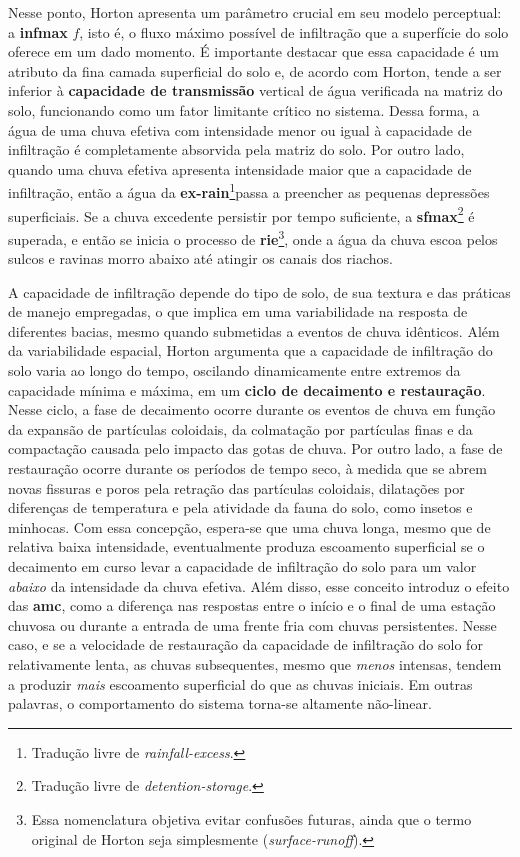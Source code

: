\documentclass[./main.tex]{subfiles}
\begin{document}
\par Nesse ponto, Horton apresenta um parâmetro crucial em seu modelo perceptual: a \textbf{\gls{infmax}} $f$, isto é, o fluxo máximo possível de infiltração que a superfície do solo oferece em um dado momento. É importante destacar que essa capacidade é um atributo da fina camada superficial do solo e, de acordo com Horton, tende a ser inferior à \textbf{capacidade de transmissão} vertical de água verificada na matriz do solo, funcionando como um fator limitante crítico no sistema. Dessa forma, a água de uma chuva efetiva com intensidade menor ou igual à capacidade de infiltração é completamente absorvida pela matriz do solo. Por outro lado, quando uma chuva efetiva apresenta intensidade maior que a capacidade de infiltração, então a água da \textbf{\gls{ex-rain}}\footnote{Tradução livre de \textit{rainfall-excess}.}passa a preencher as pequenas depressões superficiais. Se a chuva excedente persistir por tempo suficiente, a \textbf{\gls{sfmax}}\footnote{Tradução livre de \textit{detention-storage}.} é superada, e então se inicia o processo de \textbf{\gls{rie}}\footnote{Essa nomenclatura objetiva evitar confusões futuras, ainda que o termo original de Horton seja simplesmente  (\textit{surface-runoff}).}, onde a água da chuva escoa pelos sulcos e ravinas morro abaixo até atingir os canais dos riachos. 

\par A capacidade de infiltração depende do tipo de solo, de sua textura e das práticas de manejo empregadas, o que implica em uma variabilidade na resposta de diferentes bacias, mesmo quando submetidas a eventos de chuva idênticos. Além da variabilidade espacial, Horton argumenta que a capacidade de infiltração do solo varia ao longo do tempo, oscilando dinamicamente entre extremos da capacidade mínima e máxima, em um \textbf{ciclo de decaimento e restauração}. Nesse ciclo, a fase de decaimento ocorre durante os eventos de chuva em função da expansão de partículas coloidais, da colmatação por partículas finas e da compactação causada pelo impacto das gotas de chuva. Por outro lado, a fase de restauração ocorre durante os períodos de tempo seco, à medida que se abrem novas fissuras e poros pela retração das partículas coloidais, dilatações por diferenças de temperatura e pela atividade da fauna do solo, como insetos e minhocas. Com essa concepção, espera-se que uma chuva longa, mesmo que de relativa baixa intensidade, eventualmente produza escoamento superficial se o decaimento em curso levar a capacidade de infiltração do solo para um valor \textit{abaixo} da intensidade da chuva efetiva. Além disso, esse conceito introduz o efeito das \textbf{\gls{amc}}, como a diferença nas respostas entre o início e o final de uma estação chuvosa ou durante a entrada de uma frente fria com chuvas persistentes. Nesse caso, e se a velocidade de restauração da capacidade de infiltração do solo for relativamente lenta, as chuvas subsequentes, mesmo que \textit{menos} intensas, tendem a produzir \textit{mais} escoamento superficial do que as chuvas iniciais. Em outras palavras, o comportamento do sistema torna-se altamente não-linear.
\end{document}
